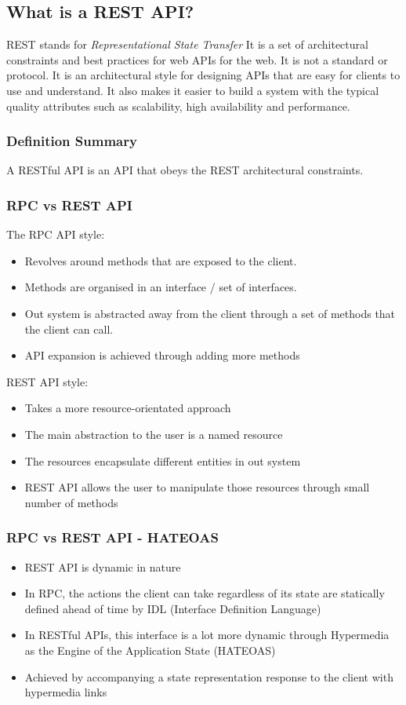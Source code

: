 \subsection{What is a REST API?}

REST stands for \textit{Representational State Transfer}
It is a set of architectural constraints and best practices for web APIs for the web.
It is not a standard or protocol.
It is an architectural style for designing APIs that are easy for clients to use and understand.
It also makes it easier to build a system with the typical quality attributes such as scalability, high availability and performance.

\subsubsection{Definition Summary}
A RESTful API is an API that obeys the REST architectural constraints.

\subsubsection{RPC vs REST API}
The RPC API style:
\begin{itemize}
    \item Revolves around methods that are exposed to the client.
    \item Methods are organised in an interface / set of interfaces.
    \item Out system is abstracted away from the client through a set of methods that the client can call.
    \item API expansion is achieved through adding more methods
\end{itemize}

REST API style:
\begin{itemize}
    \item Takes a more resource-orientated approach
    \item The main abstraction to the user is a named resource
    \item The resources encapsulate different entities in out system
    \item REST API allows the user to manipulate those resources through small number of methods
\end{itemize}

\subsubsection{RPC vs REST API - HATEOAS}
\begin{itemize}
    \item REST API is dynamic in nature
    \item In RPC, the actions the client can take regardless of its state are statically defined ahead of time by IDL (Interface Definition Language)
    \item In RESTful APIs, this interface is a lot more dynamic through Hypermedia as the Engine of the Application State (HATEOAS)
    \item Achieved by accompanying a state representation response to the client with hypermedia links
\end{itemize}

